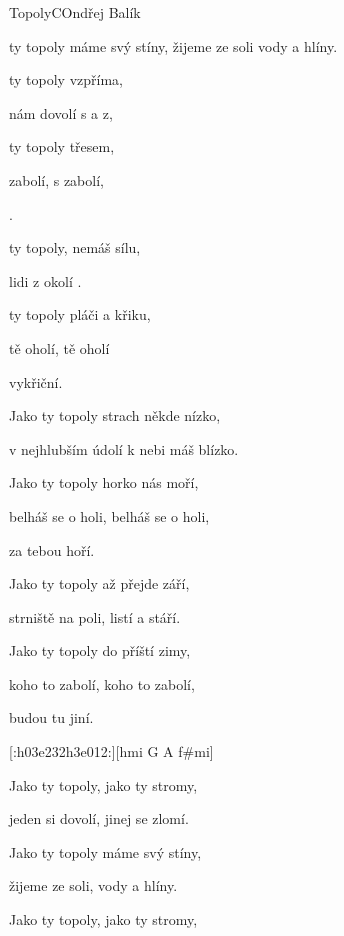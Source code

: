 \begin{song}{Topoly}{C}{Ondřej Balík}
\begin{SBChorus*}
 ty topoly máme svý stíny, žijeme ze soli vody a hlíny.
\end{SBChorus*}
\begin{SBVerse}
 ty topoly  vzpříma, 

 nám dovolí s a z,

 ty topoly  třesem,

 zabolí, s zabolí,

 .

 ty topoly,  nemáš sílu,

 lidi z okolí  .

 ty topoly  pláči a křiku,

 tě oholí,  tě oholí

 vykřiční.
\end{SBVerse}
\begin{multicols}{2}
\begin{scriptsize}
\begin{SBVerse}
Jako ty topoly strach někde nízko,

v nejhlubším údolí k nebi máš blízko.

Jako ty topoly horko nás moří,

belháš se o holi, belháš se o holi,

za tebou hoří.

Jako ty topoly až přejde září,

strniště na poli, listí a stáří.

Jako ty topoly do příští zimy,

koho to zabolí, koho to zabolí,

budou tu jiní.
\end{SBVerse}
[:h03e232h3e012:][hmi G A f\#mi]
\begin{SBVerse}
Jako ty topoly, jako ty stromy,

jeden si dovolí, jinej se zlomí.

Jako ty topoly máme svý stíny,

žijeme ze soli, vody a hlíny.

Jako ty topoly, jako ty stromy,


\end{SBVerse}
\end{scriptsize}
\end{multicols}
\end{song}
